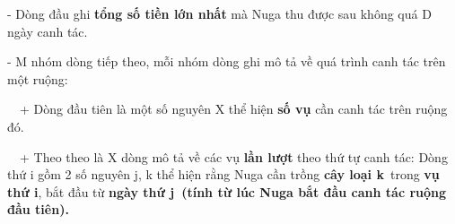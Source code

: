 - Dòng đầu ghi \textbf{tổng số tiền lớn nhất} mà Nuga thu được sau không quá D ngày canh tác.

- M nhóm dòng tiếp theo, mỗi nhóm dòng ghi mô tả về quá trình canh tác trên một ruộng:

  + Dòng đầu tiên là một số nguyên X thể hiện \textbf{số vụ} cần canh tác trên ruộng đó.

  + Theo theo là X dòng mô tả về các vụ \textbf{lần lượt} theo thứ tự canh tác: Dòng thứ i gồm 2 số nguyên j, k thể hiện rằng Nuga cần trồng \textbf{cây loại k} trong \textbf{vụ thứ i}, bắt đầu từ \textbf{ngày thứ j (tính từ lúc Nuga bắt đầu canh tác ruộng đầu tiên).}